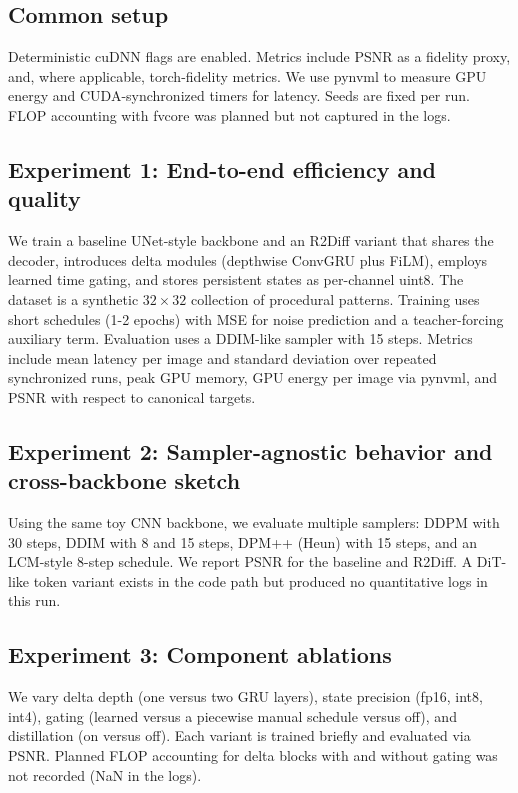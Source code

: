 \documentclass{article}
\begin{document}
\subsection{Common setup}
Deterministic cuDNN flags are enabled. Metrics include PSNR as a fidelity proxy, and, where applicable, torch-fidelity metrics. We use pynvml to measure GPU energy and CUDA-synchronized timers for latency. Seeds are fixed per run. FLOP accounting with fvcore was planned but not captured in the logs.

\subsection{Experiment 1: End-to-end efficiency and quality}
We train a baseline UNet-style backbone and an R2Diff variant that shares the decoder, introduces delta modules (depthwise ConvGRU plus FiLM), employs learned time gating, and stores persistent states as per-channel uint8. The dataset is a synthetic $32\times32$ collection of procedural patterns. Training uses short schedules (1-2 epochs) with MSE for noise prediction and a teacher-forcing auxiliary term. Evaluation uses a DDIM-like sampler with 15 steps. Metrics include mean latency per image and standard deviation over repeated synchronized runs, peak GPU memory, GPU energy per image via pynvml, and PSNR with respect to canonical targets.

\subsection{Experiment 2: Sampler-agnostic behavior and cross-backbone sketch}
Using the same toy CNN backbone, we evaluate multiple samplers: DDPM with 30 steps, DDIM with 8 and 15 steps, DPM++ (Heun) with 15 steps, and an LCM-style 8-step schedule. We report PSNR for the baseline and R2Diff. A DiT-like token variant exists in the code path but produced no quantitative logs in this run.

\subsection{Experiment 3: Component ablations}
We vary delta depth (one versus two GRU layers), state precision (fp16, int8, int4), gating (learned versus a piecewise manual schedule versus off), and distillation (on versus off). Each variant is trained briefly and evaluated via PSNR. Planned FLOP accounting for delta blocks with and without gating was not recorded (NaN in the logs).
\end{document}
